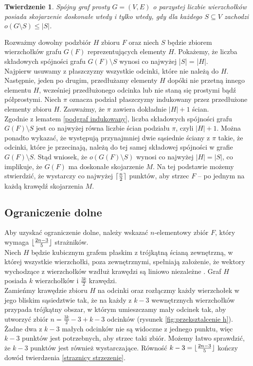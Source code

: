 \documentclass[brudnopis]{xmgr}
\DeclarePairedDelimiter\ceil{\lceil}{\rceil}
\DeclarePairedDelimiter\floor{\lfloor}{\rfloor}
\newtheorem{Twierdzenie}{Twierdzenie}
\theoremstyle{definition}
\begin{document}
\begin{Twierdzenie} \cite{tutte}
	Spójny graf prosty $G=(V,E)$ o parzystej liczbie wierzchołków posiada skojarzenie doskonałe wtedy i tylko wtedy, gdy dla każdego $S \subseteq V$ zachodzi $o(G \setminus S) \le |S|$.
\end{Twierdzenie}

Rozważmy dowolny podzbiór $H$ zbioru $F$ oraz niech $S$ będzie zbiorem wierzchołków grafu $G(F)$ reprezentujących elementy $H$. Pokażemy, że liczba składowych spójności grafu $G(F) \setminus S$ wynosi co najwyżej |$S$| = |$H$|.
\\\indent Najpierw usuwamy z płaszczyzny wszystkie odcinki, które nie należą do $H$. Następnie, jeden po drugim, przedłużamy elementy $H$ dopóki nie przetną innego elementu $H$, wcześniej przedłużonego odcinka lub nie staną się prostymi bądź półprostymi. Niech $\pi$ oznacza podział płaszczyzny indukowany przez przedłużone elementy zbioru $H$. Zauważmy, że $\pi$ zawiera dokładnie $|H| + 1$ ścian. 
\\\indent Zgodnie z lematem \ref{podgraf indukowany}, liczba składowych spójności grafu $G(F) \setminus S$ jest co najwyżej równa liczbie ścian podziału $\pi$, czyli $|H| + 1$. Można ponadto wykazać, że występują przynajmniej dwie sąsiednie ściany z $\pi$ takie, że odcinki, które je przecinają, należą do tej samej składowej spójności w grafie $G(F) \setminus S$. Stąd wniosek, że $o (G(F) \setminus S)$ wynosi co najwyżej $|H| = |S|$, co implikuje, że $G(F)$ ma doskonałe skojarzenie $M$. Na tej podstawie możemy stwierdzić, że wystarczy co najwyżej $\ceil{\frac{n}{2}}$ punktów, aby strzec $F$ -- po jednym na każdą krawędź skojarzenia $M$.
\subsection{Ograniczenie dolne}
\indent Aby uzyskać ograniczenie dolne, należy wskazać $n$-elementowy zbiór $F$, który wymaga $\floor{\frac{2n-3}{5}}$ strażników.
\\\indent Niech $H$ będzie kubicznym grafem płaskim z trójkątną ścianą zewnętrzną, w której wszystkie wierzchołki, poza zewnętrznymi, spełniają założenie, że wektory wychodzące z wierzchołków wzdłuż krawędzi są liniowo niezależne \cite{topp}. Graf $H$ posiada $k$ wierzchołków i $\frac{3k}{2}$ krawędzi.
\\\indent Zamieńmy krawędzie zbioru $H$ na odcinki oraz rozłączmy każdy wierzchołek w jego bliskim sąsiedztwie tak, że na każdy z $k - 3$ wewnętrznych wierzchołków przypada trójkątny obszar, w którym umieszczamy mały odcinek tak, aby utworzyć zbiór $n = \frac{3k}{2} - 3 + k  - 3$ odcinków (rysunek \ref{fig:przeksztalcenie h}). Żadne dwa z $k - 3$ małych odcinków nie są widoczne z jednego punktu, więc $k - 3$ punktów jest potrzebnych, aby strzec taki zbiór. Możemy łatwo sprawdzić, że $k - 3$ punktów jest również wystarczające. Równość $k - 3 = \floor{\frac{2n - 3}{5}}$ kończy dowód twierdzenia \ref{straznicy strzezenie}.
\end{document}
